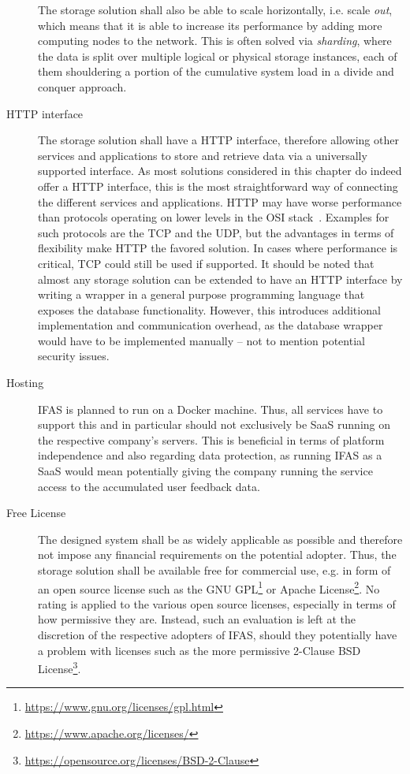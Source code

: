 \begin{description}
The storage solution shall also be able to scale horizontally, i.e. scale \emph{out}, which means that it is able to increase its performance by adding more computing nodes to the network.
This is often solved via \emph{sharding}, where the data is split over multiple logical or physical storage instances, each of them shouldering a portion of the cumulative system load in a divide and conquer approach.
\item [HTTP interface]
The storage solution shall have a \ac{HTTP} interface, therefore allowing other services and applications to store and retrieve data via a universally supported interface.
As most solutions considered in this chapter do indeed offer a \ac{HTTP} interface, this is the most straightforward way of connecting the different services and applications.
\ac{HTTP} may have worse performance than protocols operating on lower levels in the \ac{OSI} stack~\cite{zimmermann1980osi}.
Examples for such protocols are the \ac{TCP} and the \ac{UDP}, but the advantages in terms of flexibility make \ac{HTTP} the favored solution.
In cases where performance is critical, TCP could still be used if supported.
It should be noted that almost any storage solution can be extended to have an \ac{HTTP} interface by writing a wrapper in a general purpose programming language that exposes the database functionality.
However, this introduces additional implementation and communication overhead, as the database wrapper would have to be implemented manually -- not to mention potential security issues.
\item [Hosting]
\ac{IFAS} is planned to run on a Docker machine.
Thus, all services have to support this and in particular should not exclusively be \ac{SaaS} running on the respective company's servers.
This is beneficial in terms of platform independence and also regarding data protection, as running \ac{IFAS} as a \ac{SaaS} would mean potentially giving the company running the service access to the accumulated user feedback data.
\item [Free License]
The designed system shall be as widely applicable as possible and therefore not impose any financial requirements on the potential adopter.
Thus, the storage solution shall be available free for commercial use, e.g. in form of an open source license such as the GNU GPL\footnote{\url{https://www.gnu.org/licenses/gpl.html}} or Apache License\footnote{\url{https://www.apache.org/licenses/}}.
No rating is applied to the various open source licenses, especially in terms of how permissive they are.
Instead, such an evaluation is left at the discretion of the respective adopters of \ac{IFAS}, should they potentially have a problem with licenses such as the more permissive 2-Clause BSD License\footnote{\url{https://opensource.org/licenses/BSD-2-Clause}}.
\end{description}

